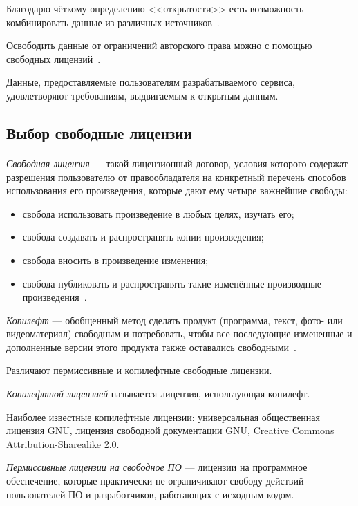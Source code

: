 Благодарю чёткому определению <<открытости>> есть возможность комбинировать данные
из различных источников~\cite{opendatahandbook_open_data}.

Освободить данные от ограничений авторского права можно с помощью свободных
лицензий~\cite{wiki_opendata}.

Данные, предоставляемые пользователям разрабатываемого сервиса, удовлетворяют требованиям, 
выдвигаемым к открытым данным.

\subsection{Выбор свободные лицензии}
\label{ssec:choice_free_licenses}

\paragraph{}
\textit{Свободная лицензия} --- такой лицензионный договор,
условия которого содержат разрешения пользователю от правообладателя
на конкретный перечень способов использования его произведения,
которые дают ему четыре важнейшие свободы:

\begin{itemize}
\item  
  свобода использовать произведение в любых целях, изучать его;
\item
  свобода создавать и распространять копии произведения;
\item
  свобода вносить в произведение изменения;
\item
  свобода публиковать и распространять такие изменённые производные произведения~\cite{wiki_free_license}.
\end{itemize}

\textit{Копилефт} --- обобщенный метод сделать продукт
(программа, текст, фото- или видеоматериал) свободным и потребовать,
чтобы все последующие измененные и дополненные версии этого продукта также оставались свободными~\cite{gnu_copyleft}.

Различают пермиссивные и копилефтные свободные лицензии.

\textit{Копилефтной лицензией} называется лицензия, использующая копилефт.

Наиболее известные копилефтные лицензии: универсальная общественная лицензия GNU, 
 лицензия свободной документации GNU, Creative Commons Attribution-Sharealike 2.0.

\textit{Пермиссивные лицензии на свободное ПО} --- лицензии на программное обеспечение,
которые практически не ограничивают свободу действий пользователей ПО и разработчиков,
работающих с исходным кодом.

